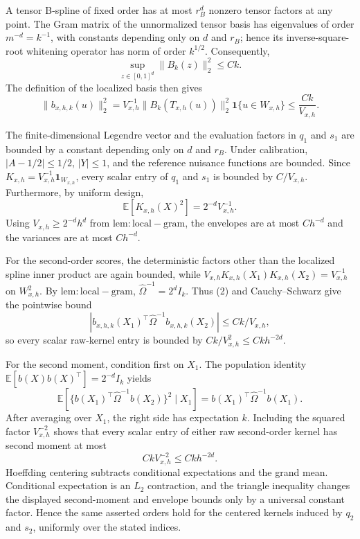 A tensor B-spline of fixed order has at most \(r_B^d\) nonzero tensor factors at any point. The Gram matrix of the unnormalized tensor basis has eigenvalues of order \(m^{-d}=k^{-1}\), with constants depending only on \(d\) and \(r_B\); hence its inverse-square-root whitening operator has norm of order \(k^{1/2}\). Consequently,
\[
\sup_{z\in[0,1]^d}\|B_k(z)\|_2^2\le Ck.
\tag{1}
\]
The definition of the localized basis then gives
\[
\|b_{x,h,k}(u)\|_2^2
=V_{x,h}^{-1}\|B_k(T_{x,h}(u))\|_2^2
\mathbf 1\{u\in W_{x,h}\}
\le\frac{Ck}{V_{x,h}}.
\tag{2}
\]

The finite-dimensional Legendre vector and the evaluation factors in \(q_1\) and \(s_1\) are bounded by a constant depending only on \(d\) and \(r_B\). Under calibration, \(|A-1/2|\le1/2\), \(|Y|\le1\), and the reference nuisance functions are bounded. Since \(K_{x,h}=V_{x,h}^{-1}\mathbf 1_{W_{x,h}}\), every scalar entry of \(q_1\) and \(s_1\) is bounded by \(C/V_{x,h}\). Furthermore, by uniform design,
\[
\mathbb E[K_{x,h}(X)^2]
=2^{-d}V_{x,h}^{-1}.
\]
Using \(V_{x,h}\ge2^{-d}h^d\) from \(\mathrm{lem:local-gram}\), the envelopes are at most \(Ch^{-d}\) and the variances are at most \(Ch^{-d}\).

For the second-order scores, the deterministic factors other than the localized spline inner product are again bounded, while \(V_{x,h}K_{x,h}(X_1)K_{x,h}(X_2)=V_{x,h}^{-1}\) on \(W_{x,h}^2\). By \(\mathrm{lem:local-gram}\), \(\widehat\Omega^{-1}=2^dI_k\). Thus (2) and Cauchy--Schwarz give the pointwise bound
\[
|b_{x,h,k}(X_1)^\top\widehat\Omega^{-1}b_{x,h,k}(X_2)|
\le Ck/V_{x,h},
\]
so every scalar raw-kernel entry is bounded by \(Ck/V_{x,h}^2\le Ckh^{-2d}\).

For the second moment, condition first on \(X_1\). The population identity \(\mathbb E[b(X)b(X)^\top]=2^{-d}I_k\) yields
\[
\mathbb E\!\left[
\{b(X_1)^\top\widehat\Omega^{-1}b(X_2)\}^2
\mid X_1\right]
=b(X_1)^\top\widehat\Omega^{-1}b(X_1).
\]
After averaging over \(X_1\), the right side has expectation \(k\). Including the squared factor \(V_{x,h}^{-2}\) shows that every scalar entry of either raw second-order kernel has second moment at most
\[
CkV_{x,h}^{-2}\le Ckh^{-2d}.
\]
Hoeffding centering subtracts conditional expectations and the grand mean. Conditional expectation is an \(L_2\) contraction, and the triangle inequality changes the displayed second-moment and envelope bounds only by a universal constant factor. Hence the same asserted orders hold for the centered kernels induced by \(q_2\) and \(s_2\), uniformly over the stated indices.